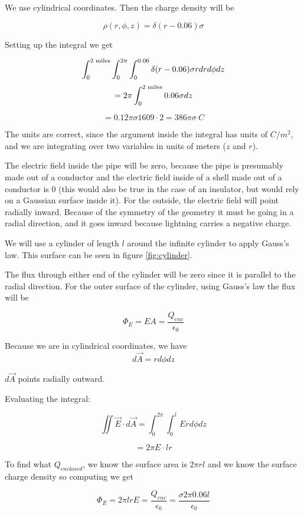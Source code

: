 \documentclass[letterpaper, reqno,11pt]{article}
\begin{document}
 We use cylindrical coordinates. Then the charge density will be 

$$
    \rho(r, \phi, z)=\delta(r-0.06)\sigma
$$

 Setting up the integral we get 

$$
    \int_0^{2\textnormal{ miles}}\int_0^{2\pi}\int_0^{0.06}\delta(r-0.06)\sigma r dr d\phi dz
$$
$$
    =2\pi\int_0^{2\textnormal{ miles}}0.06\sigma dz
$$

$$
    =0.12\pi\sigma 1609\cdot 2=386\pi\sigma\ C
$$

The units are correct, since the argument inside the integral has units of $C/m^2$, and we are integrating over two variables in units of meters ($z$ and $r$). 

 The electric field inside the pipe will be zero, because the pipe is presumably made out of a conductor and the electric field inside of a shell made out of a conductor is 0 (this would also be true in the case of an insulator, but would rely on a Gaussian surface inside it). For the outside, the electric field will point radially inward. Because of the symmetry of the geometry it must be going in a radial direction, and it goes inward because lightning carries a negative charge. 

 We will use a cylinder of length $l$ around the infinite cylinder to apply Gauss's law. This surface can be seen in figure \ref{fig:cylinder}. 

 The flux through either end of the cylinder will be zero since it is parallel to the radial direction. For the outer surface of the cylinder, using Gauss's law the flux will be

$$
    \Phi_E=EA=\frac{Q_{enc}}{\epsilon_0}
$$

 Because we are in cylindrical coordinates, we have 
$$
    d\vec A=rd\phi dz
$$

$d\vec A$ points radially outward. 

 Evaluating the integral: 

$$
    \iint \vec E\cdot d\vec A = \int_0^{2\pi}\int_0^{l} Erd\phi dz
$$

$$
    =2\pi E\cdot lr
$$

To find what $Q_{enclosed}$, we know the surface area is $2\pi r l$ and we know the surface charge density so computing we get 

$$
    \Phi_E=2\pi lrE = \frac{Q_{enc}}{\epsilon_0}=\frac{\sigma 2\pi 0.06 l}{\epsilon_0}
$$
\end{document}
